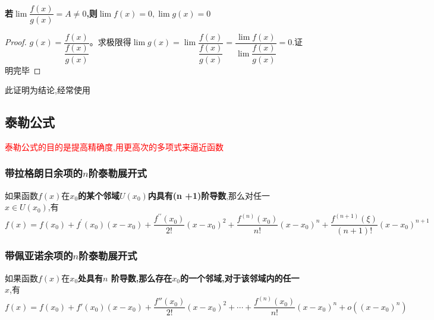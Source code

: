 \documentclass[9pt a4paper, oneside, UTF8]{ctexbook}
\begin{document}
\begin{sloppypar}
\begin{note}
\begin{align*}
        \end{align*}
    \end{note}
    \begin{problem}
    \textbf{若$\lim \dfrac{f(x)}{g(x)}=A \neq 0$,则$\lim f(x)=0 ,\lim g(x)=0 $}
    \end{problem}
    \begin{proof}
        $g(x)=\dfrac{f(x)}{\dfrac{f(x)}{g(x)}}$。求极限得$\lim g(x)=\lim \dfrac{f(x)}{\dfrac{f(x)}{g(x)}}=\dfrac{\lim f(x)}{\lim \dfrac{f(x)}{g(x)}}=0$.证明完毕
    \end{proof}
    \begin{note}
        此证明为结论,经常使用
    \end{note}
    \subsection{泰勒公式}
    \textcolor{red}{泰勒公式的目的是提高精确度,用更高次的多项式来逼近函数}
    \subsubsection{带拉格朗日余项的$n$阶泰勒展开式}
    如果函数$f(x)$在\textbf{$x_0$的某个邻域$U(x_0)$内具有(n +1)阶导数},那么对任一$x\in U(x_0)$,有
    $$
    f(x)=f(x_{0})+f^{\prime}(x_{0})(x-x_{0})+\dfrac{f^{\prime\prime}(x_{0})}{2!}(x-x_{0})^{2}+\dfrac{f^{(n)}\left(x_{0}\right)}{n!}\left(x-x_{0}\right)^{n}+{\dfrac{f^{(n+1)}(\xi)}{(n+1)!}}(x-x_{0})^{n+1}
    $$
    \subsubsection{带佩亚诺余项的$n$阶泰勒展开式}
    如果函数$f(x)$在\textbf{$x_0$处具有$n$ 阶导数,那么存在$x_{0}$的一个邻域,对于该邻域内的任一 $x$},有
    $$
    f(x)=f(x_{0})+f'(x_{0})(x-x_{0})+\dfrac{f''(x_{0})}{2!}(x-x_{0})^{2}+\cdots+\dfrac{f^{(n)}(x_{0})}{n!}(x-x_{0})^{n}+o\left(\left(x-x_{0}\right)^{n}\right)
    $$

\end{sloppypar}
\end{document}
